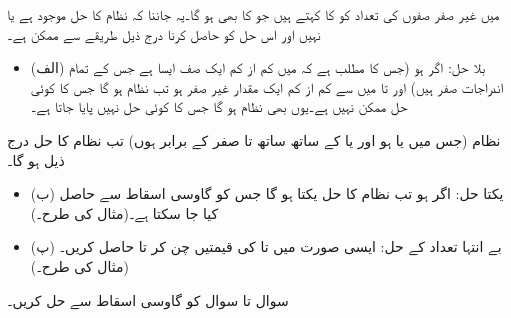   میں غیر صفر صفوں کی تعداد  کو  کا  کہتے ہیں جو  کا بھی  ہو گا۔یہ جاننا کہ نظام  کا حل موجود ہے یا نہیں اور اس حل کو حاصل کرنا درج ذیل طریقے سے ممکن ہے۔
\begin{itemize}
\item{(الف) بلا حل:}
اگر  ہو (جس کا مطلب ہے کہ  میں کم از کم ایک صف ایسا ہے جس کے تمام اندراجات صفر  ہیں) اور  تا  میں سے کم از کم ایک مقدار غیر صفر ہو تب   نظام ہو گا جس کا کوئی حل ممکن نہیں ہے۔یوں  بھی  نظام ہو گا جس کا کوئی حل نہیں پایا جاتا ہے۔ 
\end{itemize}
 نظام (جس میں یا  ہو اور یا  کے ساتھ ساتھ  تا  صفر کے برابر ہوں) تب نظام کا حل درج ذیل ہو گا۔
\begin{itemize}
\item{(ب) یکتا حل:}
اگر  ہو تب نظام کا حل یکتا ہو گا جس کو گاوسی اسقاط سے حاصل کیا جا سکتا ہے۔(مثال  کی طرح۔) 
\item{(پ) بے انتہا تعداد کے حل:}
ایسی صورت میں  تا  کی  قیمتیں چن کر  تا  حاصل کریں۔(مثال  کی طرح۔)
\end{itemize}

سوال  تا سوال  کو گاوسی اسقاط سے حل کریں۔


